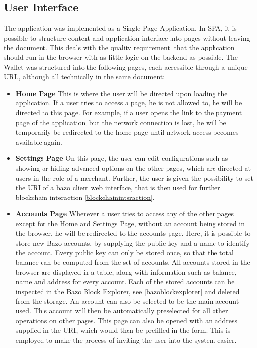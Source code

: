 \subsection{User Interface}
The application was implemented as a Single-Page-Application. In SPA, it is possible to structure content and application interface into pages without leaving the document. %
This deals with the quality requirement, that the application should run in the browser with as little logic on the backend as possible. The Wallet was structured into the following pages, each accessible through a unique URL, although all technically in the same document:
\begin{itemize}
\item \textbf{Home Page}
This is where the user will be directed upon loading the application. If a user tries to access a page, he is not allowed to, he will be directed to this page. For example, if a user opens the link to the payment page of the application, but the network connection is lost, he will be temporarily be redirected to the home page until network access becomes available again.
\item \textbf{Settings Page}
On this page, the user can edit configurations such as showing or hiding advanced options on the other pages, which are directed at users in the role of a merchant. Further, the user is given the possibility to set the URI of a bazo client web interface, that is then used for further blockchain interaction \ref{blockchaininteraction}.
\item \textbf{Accounts Page}
Whenever a user tries to access any of the other pages except for the Home and Settings Page, without an account being stored in the browser, he will be redirected to the accounts page. Here, it is possible to store new Bazo accounts, by supplying the public key and a name to identify the account. Every public key can only be stored once, so that the total balance can be computed from the set of accounts. All accounts stored in the browser are displayed in a table, along with information such as balance, name and address for every account. Each of the stored accounts can be inspected in the Bazo Block Explorer, see \ref{bazoblockexplorer} and deleted from the storage. An account can also be selected to be the main account used. This account will then be automatically preselected for all other operations on other pages.
This page can also be opened with an address supplied in the URI, which would then be prefilled in the form. This is employed to make the process of inviting the user into the system easier.

\end{itemize}

